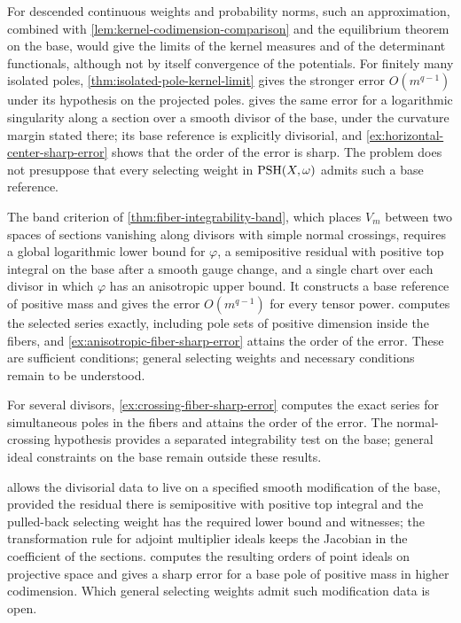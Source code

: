 For descended continuous weights and probability norms, such an approximation, combined with \cref{lem:kernel-codimension-comparison} and the equilibrium theorem on the base, would give the limits of the kernel measures and of the determinant functionals, although not by itself convergence of the potentials. For finitely many isolated poles, \cref{thm:isolated-pole-kernel-limit} gives the stronger error $O(m^{q-1})$ under its hypothesis on the projected poles.  gives the same error for a logarithmic singularity along a section over a smooth divisor of the base, under the curvature margin stated there; its base reference is explicitly divisorial, and \cref{ex:horizontal-center-sharp-error} shows that the order of the error is sharp. The problem does not presuppose that every selecting weight in $\mathrm{PSH}(X,\omega)$ admits such a base reference.

The band criterion of \cref{thm:fiber-integrability-band}, which places $V_m$ between two spaces of sections vanishing along divisors with simple normal crossings, requires a global logarithmic lower bound for $\varphi$, a semipositive residual with positive top integral on the base after a smooth gauge change, and a single chart over each divisor in which $\varphi$ has an anisotropic upper bound. It constructs a base reference of positive mass and gives the error $O(m^{q-1})$ for every tensor power.  computes the selected series exactly, including pole sets of positive dimension inside the fibers, and \cref{ex:anisotropic-fiber-sharp-error} attains the order of the error. These are sufficient conditions; general selecting weights and necessary conditions remain to be understood.

For several divisors, \cref{ex:crossing-fiber-sharp-error} computes the exact series for simultaneous poles in the fibers and attains the order of the error. The normal-crossing hypothesis provides a separated integrability test on the base; general ideal constraints on the base remain outside these results.

 allows the divisorial data to live on a specified smooth modification of the base, provided the residual there is semipositive with positive top integral and the pulled-back selecting weight has the required lower bound and witnesses; the transformation rule for adjoint multiplier ideals keeps the Jacobian in the coefficient of the sections.  computes the resulting orders of point ideals on projective space and gives a sharp error for a base pole of positive mass in higher codimension. Which general selecting weights admit such modification data is open.

